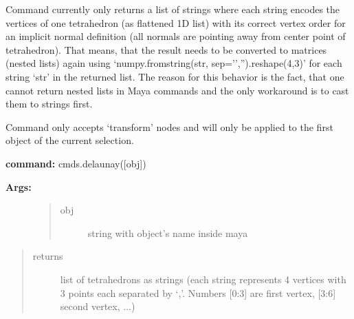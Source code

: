 \documentclass[letterpaper,10pt,english]{sphinxmanual}
\begin{document}
Command currently only returns a list of strings where each string encodes the vertices of one tetrahedron (as flattened 1D list) with its correct vertex order for an implicit normal definition (all normals are pointing away from center point of tetrahedron). That means, that the result needs to be converted to matrices (nested lists) again using `numpy.fromstring(str, sep='','').reshape(4,3)' for each string `str' in the returned list. The reason for this behavior is the fact, that one cannot return nested lists in Maya commands and the only workaround is to cast them to strings first.

Command only accepts `transform' nodes and will only be applied to the first object of the current selection.

\textbf{command:} cmds.delaunay({[}obj{]})
\begin{description}
\item[{\textbf{Args:}}] \leavevmode\begin{quote}\begin{description}
\item[{obj}] \leavevmode
string with object's name inside maya

\end{description}\end{quote}

\end{description}
\begin{quote}\begin{description}
\item[{returns}] \leavevmode
list of tetrahedrons as strings (each string represents 4 vertices with 3 points each separated by `,'. Numbers {[}0:3{]} are first vertex, {[}3:6{]} second vertex, ...)

\end{description}\end{quote}
\end{document}
